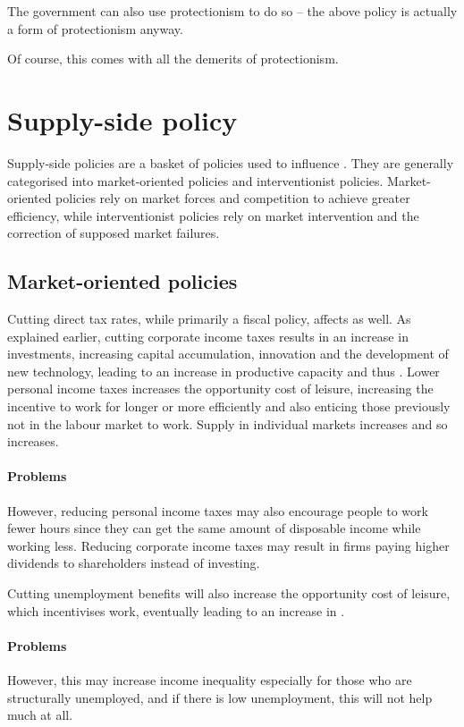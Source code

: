 \documentclass[Economics.tex]{subfiles}
\begin{document}
The government can also use protectionism to do so -- the above policy is actually a form of protectionism anyway.

Of course, this comes with all the demerits of protectionism.
\section{Supply-side policy}
Supply-side policies are a basket of policies used to influence \AS{}. They are generally categorised into market-oriented policies and interventionist policies. Market-oriented policies rely on market forces and competition to achieve greater efficiency, while interventionist policies rely on market intervention and the correction of supposed market failures.
\subsection{Market-oriented policies}
Cutting direct tax rates, while primarily a fiscal policy, affects \AS{} as well. As explained earlier, cutting corporate income taxes results in an increase in investments, increasing capital accumulation, innovation and the development of new technology, leading to an increase in productive capacity and thus \AS{}. Lower personal income taxes increases the opportunity cost of leisure, increasing the incentive to work for longer or more efficiently and also enticing those previously not in the labour market to work. Supply in individual markets increases and so \AS{} increases.

\paragraph{Problems} However, reducing personal income taxes may also encourage people to work fewer hours since they can get the same amount of disposable income while working less. Reducing corporate income taxes may result in firms paying higher dividends to shareholders instead of investing.

Cutting unemployment benefits will also increase the opportunity cost of leisure, which incentivises work, eventually leading to an increase in \AS{}.

\paragraph{Problems} However, this may increase income inequality especially for those who are structurally unemployed, and if there is low unemployment, this will not help much at all.
\end{document}

